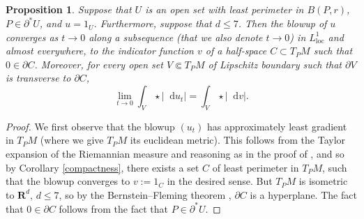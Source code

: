 \documentclass[reqno,11pt]{amsart}
\newcommand{\RR}{\mathbf{R}}
\newcommand*\dif{\mathop{}\!\mathrm{d}}
\newcommand{\loc}{\mathrm{loc}}
\newcommand{\cpt}{\mathrm{cpt}}
\newtheorem{proposition}[theorem]{Proposition}
\theoremstyle{definition}
\numberwithin{equation}{section}
\begin{document}
\begin{proposition}\label{blowup theorem}
Suppose that $U$ is an open set with least perimeter in $B(P, r)$, $P \in \partial^* U$, and $u = 1_U$.
Furthermore, suppose that $d \leq 7$.
Then the blowup of $u$ converges as $t \to 0$ along a subsequence (that we also denote $t \to 0$) in $L^1_\loc$ and almost everywhere, to the indicator function $v$ of a half-space $C \subset T_PM$ such that $0 \in \partial C$.
Moreover, for every open set $V \Subset T_PM$ of Lipschitz boundary such that $\partial V$ is transverse to $\partial C$,
$$\lim_{t \to 0} \int_V \star |\dif u_t| = \int_V \star |\dif v|.$$
\end{proposition}
\begin{proof}
We first observe that the blowup $(u_t)$ has approximately least gradient in $T_PM$ (where we give $T_PM$ its euclidean metric).
This follows from the Taylor expansion of the Riemannian measure and reasoning as in the proof of \cite[Theorem 9.3]{Giusti77}, and so by Corollary \ref{compactness}, there exists a set $C$ of least perimeter in $T_PM$, such that the blowup converges to $v := 1_C$ in the desired sense.
But $T_PM$ is isometric to $\RR^d$, $d \leq 7$, so by the Bernstein--Fleming theorem \cite[Theorem 17.3]{Giusti77}, $\partial C$ is a hyperplane.
The fact that $0 \in \partial C$ follows from the fact that $P \in \partial^* U$.
\end{proof}
\end{document}
